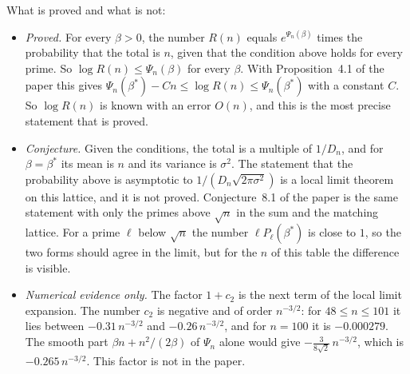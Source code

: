\documentclass[10pt]{article}
\begin{document}
What is proved and what is not:
\begin{itemize}\itemsep0pt
\item \emph{Proved.} For every $\beta>0$, the number $R(n)$ equals $e^{\Psi_n(\beta)}$ times the probability
that the total is $n$, given that the condition above holds for every prime. So $\log R(n)\le\Psi_n(\beta)$ for
every $\beta$. With Proposition~4.1 of the paper this gives
$\Psi_n(\beta^*)-Cn\le\log R(n)\le\Psi_n(\beta^*)$ with a constant $C$. So $\log R(n)$ is known with an
error $O(n)$, and this is the most precise statement that is proved.
\item \emph{Conjecture.} Given the conditions, the total is a multiple of $1/D_n$, and for $\beta=\beta^*$ its
mean is $n$ and its variance is $\sigma^2$. The statement that the probability above is asymptotic to
$1/(D_n\sqrt{2\pi\sigma^2})$ is a local limit theorem on this lattice, and it is not proved. Conjecture~8.1 of
the paper is the same statement with only the primes above $\sqrt n$ in the sum and the matching lattice.
For a prime $\ell$ below $\sqrt n$ the number $\ell P_\ell(\beta^*)$ is close to $1$, so the two forms should
agree in the limit, but for the $n$ of this table the difference is visible.
\item \emph{Numerical evidence only.} The factor $1+c_2$ is the next term of the local limit expansion. The
number $c_2$ is negative and of order $n^{-3/2}$: for $48\le n\le 101$ it lies between
$-0.31\,n^{-3/2}$ and $-0.26\,n^{-3/2}$, and for $n=100$ it is $-0.000279$. The smooth part
$\beta n+n^2/(2\beta)$ of $\Psi_n$ alone would give $-\frac{3}{8\sqrt2}\,n^{-3/2}$, which is
$-0.265\,n^{-3/2}$. This factor is not in the paper.
\end{itemize}

\end{document}
